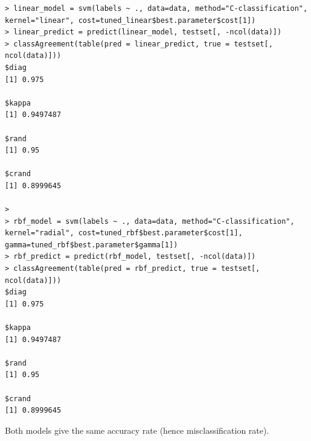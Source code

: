 \documentclass[11pt]{scrartcl}
\begin{document}
\begin{lstlisting}
> linear_model = svm(labels ~ ., data=data, method="C-classification", kernel="linear", cost=tuned_linear$best.parameter$cost[1])
> linear_predict = predict(linear_model, testset[, -ncol(data)])
> classAgreement(table(pred = linear_predict, true = testset[, ncol(data)]))
$diag
[1] 0.975

$kappa
[1] 0.9497487

$rand
[1] 0.95

$crand
[1] 0.8999645

> 
> rbf_model = svm(labels ~ ., data=data, method="C-classification", kernel="radial", cost=tuned_rbf$best.parameter$cost[1], gamma=tuned_rbf$best.parameter$gamma[1])
> rbf_predict = predict(rbf_model, testset[, -ncol(data)])
> classAgreement(table(pred = rbf_predict, true = testset[, ncol(data)]))
$diag
[1] 0.975

$kappa
[1] 0.9497487

$rand
[1] 0.95

$crand
[1] 0.8999645
\end{lstlisting}

Both models give the same accuracy rate (hence misclassification rate).
\end{document}
